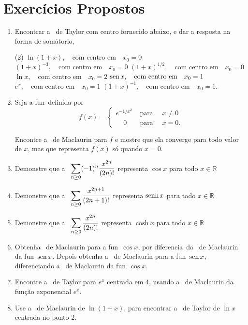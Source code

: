 \section*{Exercícios Propostos}
\begin{enumerate}[label=(\arabic*)]
\item Encontrar a \ser\ de Taylor com centro fornecido abaixo, e dar a resposta na forma de som\'atorio,
\begin{tasks}[label=(\alph*),item-indent=1.0cm,label-width=4ex,ref=(\alph*)](2)
\task \(\ln(1+x),\quad \text{com centro em}\quad  x_{0}=0\)
\task \((1+x)^{-3},\quad \text{com centro em}\quad  x_{0}=0\)
\task \((1+x)^{1/2},\quad \text{com centro em}\quad x_{0}=0\)
\task \(\ln x,\quad \text{com centro em}\quad  x_{0}=2\)
\task \(\operatorname{sen} x,\quad  \text{com centro em}\quad  x_{0}=1\)
\task \(e^{x},\quad  \text{com centro em}\quad  x_{0}=1\)
\task \((1+x)^{-1},\quad  \text{com centro em}\quad  x_{0}=1\).
\end{tasks}
\item Seja a fun\cao\ definida por
\begin{equation*}
f(x)=\begin{cases}
e^{-1/x^2} & \text{ para }\quad x\not= 0 \\[2ex]
\phantom{xx} 0 & \text{ para }\quad x=0.
\end{cases}
\end{equation*}

Encontre a \ser\ de Maclaurin para $f$ e mostre que ela converge
para todo valor de $x$, mas que representa $f(x)$ s\'o quando
$x=0$.

\item Demonstre que a \ser\ $\displaystyle{\sum_{n\geq
0}(-1)^{n}\frac{x^{2n}}{(2n)!}}$ representa $\cos x$ para todo
$x\in \mathbb{R}$

\item Demonstre que a \ser\ $\displaystyle{\sum_{n\geq
0}\frac{x^{2n+1}}{(2n+1)!}}$ representa $\operatorname{senh} x$ para todo $x\in
\mathbb{R}$

\item Demonstre que a \ser\ $\displaystyle{\sum_{n\geq
0}\frac{x^{2n}}{(2n)!}}$ representa $\cosh x$ para todo $x\in
\mathbb{R}$

\item Obtenha  \ser\ de Maclaurin para a fun\cao\
$\cos x$, por diferencia\cao\ da \ser\ de Maclaurin da fun\cao\
$\operatorname{sen} x$. Depois obtenha a \ser\ de Maclaurin para a fun\cao\
$\operatorname{sen} x$, diferenciando a \ser\ de Maclaurin da fun\cao\  $\cos
x$.

\item Encontre a \ser\ de Taylor para $e^{x}$ centrada em $4$,
usando a \ser\ de Maclaurin da função exponencial  $e^x$.

\item Use a \ser\
de Maclaurin de $\ln(1+x)$, para encontrar a \ser\ de Taylor de $\ln x$ centrada no ponto $2$.
\end{enumerate}


